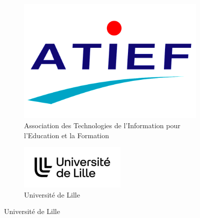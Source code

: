 \begin{figure}[!ht]
	\begin{subfigure}{0.4\textwidth}
		\includegraphics[width=\textwidth]{Content/figures/atief.png}
		\caption{Association des Technologies de l'Information pour l'Education et la Formation}
	\end{subfigure}
	\hfill
	\begin{subfigure}{0.4\textwidth}
		\includegraphics[width=\textwidth]{Content/figures/univLille.png}
		\caption{Université de Lille}
	\end{subfigure}

	\vspace{0.08\textheight}
	

\end{figure}
